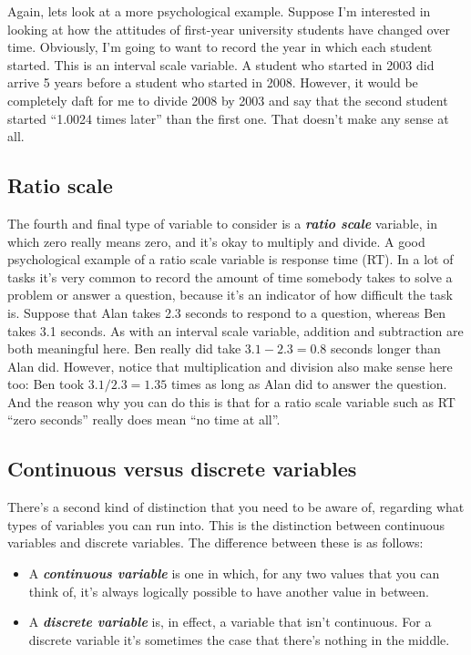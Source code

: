 \documentclass[
]{book}
\providecommand{\tightlist}{%
  \setlength{\itemsep}{0pt}\setlength{\parskip}{0pt}}
\begin{document}
Again, lets look at a more psychological example. Suppose I'm interested in looking at how the attitudes of first-year university students have changed over time. Obviously, I'm going to want to record the year in which each student started. This is an interval scale variable. A student who started in 2003 did arrive 5 years before a student who started in 2008. However, it would be completely daft for me to divide 2008 by 2003 and say that the second student started ``1.0024 times later'' than the first one. That doesn't make any sense at all.

\hypertarget{ratio-scale}{%
\subsection{Ratio scale}\label{ratio-scale}}

The fourth and final type of variable to consider is a \textbf{\emph{ratio scale}} variable, in which zero really means zero, and it's okay to multiply and divide. A good psychological example of a ratio scale variable is response time (RT). In a lot of tasks it's very common to record the amount of time somebody takes to solve a problem or answer a question, because it's an indicator of how difficult the task is. Suppose that Alan takes 2.3 seconds to respond to a question, whereas Ben takes 3.1 seconds. As with an interval scale variable, addition and subtraction are both meaningful here. Ben really did take \(3.1 - 2.3 = 0.8\) seconds longer than Alan did. However, notice that multiplication and division also make sense here too: Ben took \(3.1 / 2.3 = 1.35\) times as long as Alan did to answer the question. And the reason why you can do this is that for a ratio scale variable such as RT ``zero seconds'' really does mean ``no time at all''.

\hypertarget{continuousdiscrete}{%
\subsection{Continuous versus discrete variables}\label{continuousdiscrete}}

There's a second kind of distinction that you need to be aware of, regarding what types of variables you can run into. This is the distinction between continuous variables and discrete variables. The difference between these is as follows:

\begin{itemize}
\tightlist
\item
  A \textbf{\emph{continuous variable}} is one in which, for any two values that you can think of, it's always logically possible to have another value in between.
\item
  A \textbf{\emph{discrete variable}} is, in effect, a variable that isn't continuous. For a discrete variable it's sometimes the case that there's nothing in the middle.
\end{itemize}
\end{document}
